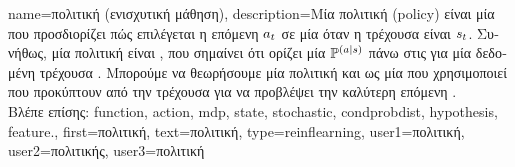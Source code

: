{name={\foreignlanguage{greek}{πολιτική (ενισχυτική μάθηση)}},
	description={\foreignlanguage{greek}{Μία πολιτική} (policy) 
		\foreignlanguage{greek}{είναι μία}  \foreignlanguage{greek}{που προσδιορίζει 
		πώς επιλέγεται η επόμενη}  $a_{t}$ \foreignlanguage{greek}{σε μία} 
		 \foreignlanguage{greek}{όταν η τρέχουσα}  
		\foreignlanguage{greek}{είναι $s_{t}$. Συνήθως, μία πολιτική είναι} , 
		\foreignlanguage{greek}{που σημαίνει ότι ορίζει μία}  $\mathbb{P}^{(a \mid s)}$ 
		\foreignlanguage{greek}{πάνω στις}  \foreignlanguage{greek}{για μία δεδομένη τρέχουσα} 
		. \foreignlanguage{greek}{Μπορούμε να θεωρήσουμε μία πολιτική και ως μία} 
		 \foreignlanguage{greek}{που χρησιμοποιεί}  
		\foreignlanguage{greek}{που προκύπτουν από την τρέχουσα}  \foreignlanguage{greek}{για 
		να προβλέψει την καλύτερη επόμενη}  \cite{SuttonEd2}.
		\\
		\foreignlanguage{greek}{Βλέπε επίσης:} \gls{function}, \gls{action}, \gls{mdp}, \gls{state}, \gls{stochastic},
		\gls{condprobdist}, \gls{hypothesis}, \gls{feature}.},
	first={\foreignlanguage{greek}{πολιτική}},
	text={\foreignlanguage{greek}{πολιτική}},
	type=reinflearning,
	user1={\foreignlanguage{greek}{πολιτική}}, %
  	user2={\foreignlanguage{greek}{πολιτικής}}, %
	user3={\foreignlanguage{greek}{πολιτική}} %
}

